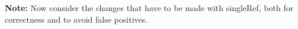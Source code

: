 
\textbf{Note:} Now consider the changes that have to be made with singleRef,
both for correctness and to avoid false positives. 











